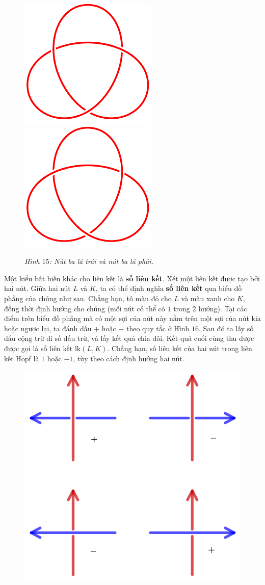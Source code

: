\begin{multicols}{2}
	\begin{figure}[H]
		\vspace*{-5pt}
		\centering
		\captionsetup{labelformat= empty, justification=centering}
		\includegraphics[width= 0.38\linewidth]{trefoil.pdf}\quad\quad
		\includegraphics[width= 0.38\linewidth]{mirror trefoil.pdf}
		\caption{\small\textit{\color{duongvaotoanhoc}Hình $15$: Nút ba lá trái và nút ba lá phải.}}
		\vspace*{-10pt}
	\end{figure}
	Một kiểu bất biến khác cho liên kết là {\bf\color{duongvaotoanhoc} số liên kết}. Xét một liên kết được tạo bởi hai nút. Giữa hai nút $L$ và $K$, ta có thể định nghĩa {\bf\color{duongvaotoanhoc} số liên kết} qua biểu đồ phẳng của chúng như sau. Chẳng hạn, tô màu đỏ cho $L$ và màu xanh cho $K$, đồng thời định hướng cho chúng (mỗi nút có thể có $1$ trong $2$ hướng). Tại các điểm trên biểu đồ phẳng mà có một sợi của nút này nằm trên một sợi của nút kia hoặc ngược lại, ta đánh dấu $+$ hoặc $-$ theo quy tắc ở Hình $16$. Sau đó ta lấy số dấu cộng trừ đi số dấu trừ, và lấy kết quả chia đôi. Kết quả cuối cùng thu được được gọi là số liên kết $\text{lk}(L,K)$. Chẳng hạn, số liên kết của hai nút trong liên kết Hopf là $1$ hoặc $-1$, tùy theo cách định hướng hai nút.
	\begin{figure}[H]
		\vspace*{-5pt}
		\centering
		\captionsetup{labelformat= empty, justification=centering}
		\includegraphics[width= 0.65\linewidth]{h16}

\end{figure}
\end{multicols}
